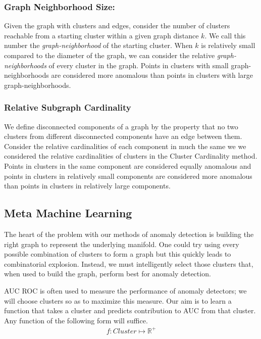 \subsubsection{Graph Neighborhood Size:}
Given the graph with clusters and edges, consider the number of clusters reachable from a starting cluster within a given graph distance $k$.
We call this number the \textit{graph-neighborhood} of the starting cluster.
When $k$ is relatively small compared to the diameter of the graph, we can consider the relative \textit{graph-neighborhoods} of every cluster in the graph.
Points in clusters with small graph-neighborhoods are considered more anomalous than points in clusters with large graph-neighborhoods.

\subsubsection{Relative Subgraph Cardinality}
We define disconnected components of a graph by the property that no two clusters from different disconnected components have an edge between them.
Consider the relative cardinalities of each component in much the same we we considered the relative cardinalities of clusters in the Cluster Cardinality method.
Points in clusters in the same component are considered equally anomalous and points in clusters in relatively small components are considered more anomalous than points in clusters in relatively large components.



\subsection{Meta Machine Learning}
\label{subsec:chaoda:meta-machine-learning}
The heart of the problem with our methods of anomaly detection is building the right graph to represent the underlying manifold.
One could try using every possible combination of clusters to form a graph but this quickly leads to combinatorial explosion.
Instead, we must intelligently select those clusters that, when used to build the graph, perform best for anomaly detection.

AUC ROC is often used to measure the performance of anomaly detectors;
we will choose clusters so as to maximize this measure.
Our aim is to learn a function that takes a cluster and predicts contribution to AUC from that cluster.
Any function of the following form will suffice.
\begin{gather*}
    f: Cluster \mapsto \mathbb{R}^+
\end{gather*}

